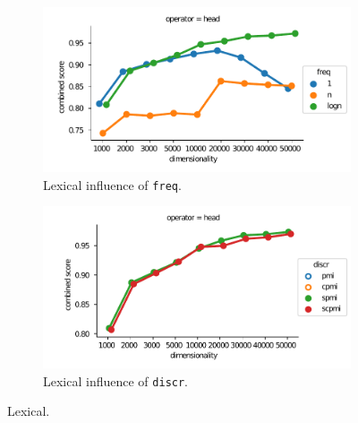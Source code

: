 \begin{figure}[t]
  \centering

  \begin{subfigure}[t]{0.49\textwidth}
    \includegraphics[width=\textwidth]{supplement/figures/lexical-interaction-freq}

    \caption{Lexical influence of \texttt{freq}.}
    \label{fig:lexical-freq}
  \end{subfigure}
  \begin{subfigure}[t]{0.49\textwidth}
    \includegraphics[width=\textwidth]{supplement/figures/lexical-interaction-discr}

    \caption{Lexical influence of \texttt{discr}.}
    \label{fig:lexical-discr}
  \end{subfigure}

  \caption{Lexical.}
\end{figure}
